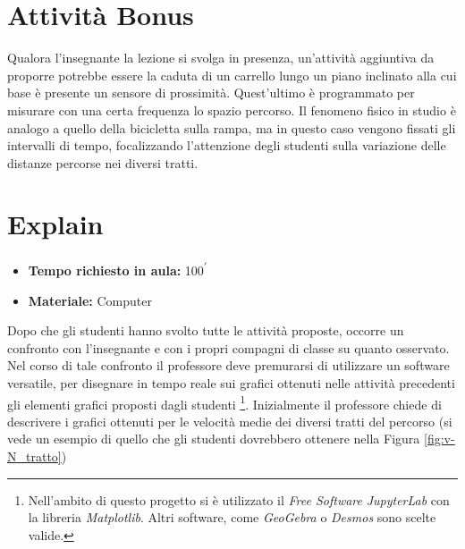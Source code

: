 \documentclass{report} \usepackage[T1]{fontenc} \usepackage[italian]{babel}
\begin{document}
\section{Attività Bonus}
Qualora l’insegnante la lezione si svolga in presenza, un'attività aggiuntiva da
proporre potrebbe essere la caduta di un carrello lungo un piano inclinato
alla cui base è presente un sensore di prossimità. Quest’ultimo è programmato
per misurare con una certa frequenza lo spazio percorso.
Il fenomeno fisico in studio è analogo a quello della bicicletta sulla rampa,
ma in questo caso vengono fissati gli
intervalli di tempo, focalizzando l’attenzione degli studenti sulla variazione
delle distanze percorse nei diversi tratti.

\section{Explain}\label{a_explain}

\begin{itemize}
\item \textbf{Tempo richiesto in aula:} 100\textsuperscript{$\prime$}
\item \textbf{Materiale:} Computer
\end{itemize}

Dopo che gli studenti hanno svolto tutte le attività proposte, occorre un
confronto con l’insegnante e con i propri compagni di classe su quanto
osservato. Nel corso di tale confronto il professore deve premurarsi di
utilizzare un software versatile,  per disegnare in tempo reale
sui grafici ottenuti nelle attività precedenti gli elementi grafici
proposti dagli studenti
\footnote{
          Nell'ambito di questo progetto si è utilizzato il
          \emph{Free Software}
          \emph{JupyterLab} con la libreria \emph{Matplotlib}.
          Altri software, come \emph{GeoGebra} o \emph{Desmos}
          sono scelte valide.
         }.
Inizialmente il professore chiede di descrivere i grafici ottenuti per le
velocità medie dei diversi tratti del percorso (si vede un esempio di quello
che gli studenti dovrebbero ottenere nella Figura \ref{fig:v-N_tratto})
\end{document}
